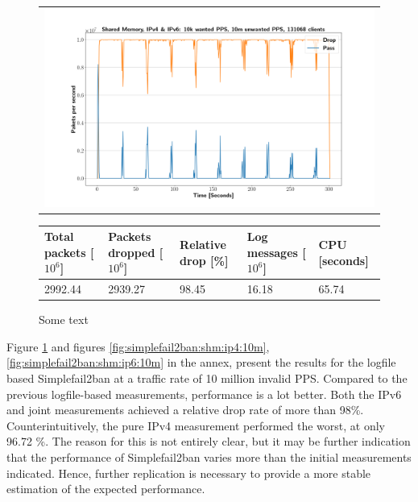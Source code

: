\pagebreak

\begin{figure}[!h]
	\label{fig:simplefail2ban:shm:ip46:10m}
	\centering
	\scriptsize
	\begin{tabular}{c}
    	\centerline{\includegraphics[width=1.2\textwidth]{images/simplefail2ban_shm_ipv46_v10k_iv10m_c131068.png}}
	\end{tabular}
	\begin{tabular}{lllll}
		\toprule
		\textbf{Total packets [$10^6$]} & \textbf{Packets dropped [$10^6$]} & \textbf{Relative drop [\%]} & \textbf{Log messages [$10^6$]} & \textbf{CPU [seconds]} \\ \midrule 
		2992.44 & 2939.27 & 98.45 & 16.18 & 65.74 \\
		\bottomrule
	\end{tabular}
	\caption[Simplefail2ban, Shared Memory, IPv4 \& IPv6, 10m \ac{PPS}]{Some text}
\end{figure}

Figure \ref{fig:simplefail2ban:shm:ip46:10m} and figures \ref{fig:simplefail2ban:shm:ip4:10m}, \ref{fig:simplefail2ban:shm:ip6:10m} in the annex, present the results
for the logfile based Simplefail2ban at a traffic rate of 10 million invalid \ac{PPS}. Compared to the previous logfile-based measurements,
performance is a lot better. Both the \ac{IPv6} and joint measurements achieved a relative drop rate of more than 98\%. Counterintuitively, the
pure \ac{IPv4} measurement performed the worst, at only 96.72 \%. The reason for this is not entirely clear, but it may be further
indication that the performance of Simplefail2ban varies more than the initial measurements indicated. Hence, further replication
is necessary to provide a more stable estimation of the expected performance. 

